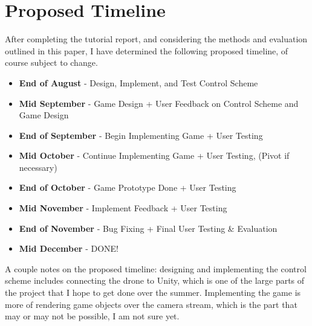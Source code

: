 \documentclass[10pt,twocolumn]{article}
\begin{document}
\section{Proposed Timeline}
After completing the tutorial report, and considering the methods and evaluation outlined in this paper, I have determined the following proposed timeline, of course subject to change.

\begin{itemize}
    \item \textbf{End of August} - Design, Implement, and Test Control Scheme 
    \item \textbf{Mid September} - Game Design + User Feedback on Control Scheme and Game Design
    \item \textbf{End of September} - Begin Implementing Game + User Testing
    \item \textbf{Mid October} - Continue Implementing Game + User Testing, (Pivot if necessary)
    \item \textbf{End of October} - Game Prototype Done + User Testing
    \item \textbf{Mid November} - Implement Feedback + User Testing
    \item \textbf{End of November} - Bug Fixing + Final User Testing \& Evaluation
    \item \textbf{Mid December} - DONE!
\end{itemize}

A couple notes on the proposed timeline: designing and implementing the control scheme includes connecting the drone to Unity, which is one of the large parts of the project that I hope to get done over the summer. Implementing the game is more of rendering game objects over the camera stream, which is the part that may or may not be possible, I am not sure yet.



\printbibliography 
\end{document}
